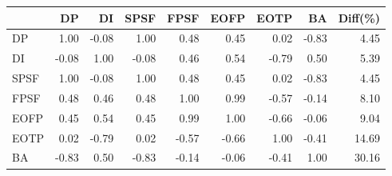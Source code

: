 \begin{tabular}{l|rrrrrrr|r}
\toprule
 & DP & DI & SPSF & FPSF & EOFP & EOTP & BA & Diff(\%)  \\
\midrule
DP & 1.00 & -0.08 & 1.00 & 0.48 & 0.45 & 0.02 & -0.83 & 4.45  \\
DI & -0.08 & 1.00 & -0.08 & 0.46 & 0.54 & -0.79 & 0.50 & 5.39  \\
SPSF & 1.00 & -0.08 & 1.00 & 0.48 & 0.45 & 0.02 & -0.83 & 4.45  \\
FPSF & 0.48 & 0.46 & 0.48 & 1.00 & 0.99 & -0.57 & -0.14 & 8.10  \\
EOFP & 0.45 & 0.54 & 0.45 & 0.99 & 1.00 & -0.66 & -0.06 & 9.04  \\
EOTP & 0.02 & -0.79 & 0.02 & -0.57 & -0.66 & 1.00 & -0.41 & 14.69  \\
BA & -0.83 & 0.50 & -0.83 & -0.14 & -0.06 & -0.41 & 1.00 & 30.16  \\
\bottomrule
\end{tabular}

